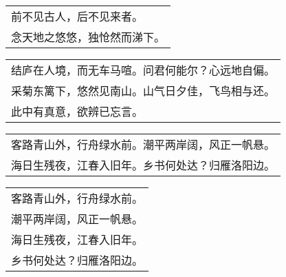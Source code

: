 \nopagebreak%
\nopagebreak%
\noindent\begin{minipage}{\linewidth}
  \vskip-3pt\begin{table}[H]
    \centering
    \begin{tabular}{@{}l@{}}
前不见古人，后不见来者。\\
念天地之悠悠，独怆然而涕下。
    \end{tabular}
  \end{table}
\end{minipage}
\vspace{1cm}


\nopagebreak%
\nopagebreak%
\noindent\begin{minipage}{\linewidth}
  \vskip-3pt\begin{table}[H]
    \centering
    \begin{tabular}{@{}l@{}}
结庐在人境，而无车马喧。问君何能尔？心远地自偏。\\
采菊东篱下，悠然见南山。山气日夕佳，飞鸟相与还。\\
此中有真意，欲辨已忘言。
    \end{tabular}
  \end{table}
\end{minipage}
\vspace{1cm}


\nopagebreak%
\nopagebreak%
\noindent\begin{minipage}{\linewidth}
  \vskip-3pt\begin{table}[H]
    \centering
    \begin{tabular}{@{}l@{}}
客路青山外，行舟绿水前。潮平两岸阔，风正一帆悬。\\
海日生残夜，江春入旧年。乡书何处达？归雁洛阳边。
    \end{tabular}
  \end{table}
\end{minipage}
\vspace{1cm}


\nopagebreak%
\nopagebreak%
\noindent\begin{minipage}{\linewidth}
  \vskip-3pt\begin{table}[H]
    \centering
    \begin{tabular}{@{}l@{}}
客路青山外，行舟绿水前。\\
潮平两岸阔，风正一帆悬。\\
海日生残夜，江春入旧年。\\
乡书何处达？归雁洛阳边。
    \end{tabular}
  \end{table}
\end{minipage}
\vspace{1cm}


